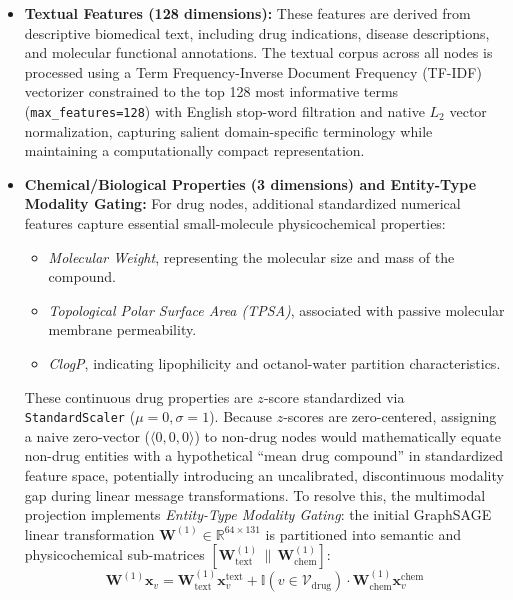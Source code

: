 \documentclass[preprint,12pt]{elsarticle}
\begin{document}
\begin{itemize}
    \item \textbf{Textual Features (128 dimensions):} 
    These features are derived from descriptive biomedical text, including drug indications, disease descriptions, and molecular functional annotations. The textual corpus across all nodes is processed using a Term Frequency-Inverse Document Frequency (TF-IDF) vectorizer constrained to the top 128 most informative terms (\texttt{max\_features=128}) with English stop-word filtration and native $L_2$ vector normalization, capturing salient domain-specific terminology while maintaining a computationally compact representation.
    
    \item \textbf{Chemical/Biological Properties (3 dimensions) and Entity-Type Modality Gating:} 
    For drug nodes, additional standardized numerical features capture essential small-molecule physicochemical properties:
    \begin{itemize}
        \item \textit{Molecular Weight}, representing the molecular size and mass of the compound.
        \item \textit{Topological Polar Surface Area (TPSA)}, associated with passive molecular membrane permeability.
        \item \textit{ClogP}, indicating lipophilicity and octanol-water partition characteristics.
    \end{itemize}
    These continuous drug properties are $z$-score standardized via \texttt{StandardScaler} ($\mu=0, \sigma=1$). Because $z$-scores are zero-centered, assigning a naive zero-vector ($\langle 0, 0, 0 \rangle$) to non-drug nodes would mathematically equate non-drug entities with a hypothetical ``mean drug compound'' in standardized feature space, potentially introducing an uncalibrated, discontinuous modality gap during linear message transformations. To resolve this, the multimodal projection implements \textit{Entity-Type Modality Gating}: the initial GraphSAGE linear transformation $\mathbf{W}^{(1)} \in \mathbb{R}^{64 \times 131}$ is partitioned into semantic and physicochemical sub-matrices $[\mathbf{W}_{\text{text}}^{(1)} \,\|\, \mathbf{W}_{\text{chem}}^{(1)}]$:
    \begin{equation}
    \mathbf{W}^{(1)} \mathbf{x}_v = \mathbf{W}_{\text{text}}^{(1)} \mathbf{x}_v^{\text{text}} + \mathbb{I}(v \in \mathcal{V}_{\text{drug}}) \cdot \mathbf{W}_{\text{chem}}^{(1)} \mathbf{x}_v^{\text{chem}}
    \label{eq:modality_gating}

\end{equation}
\end{itemize}
\end{document}

